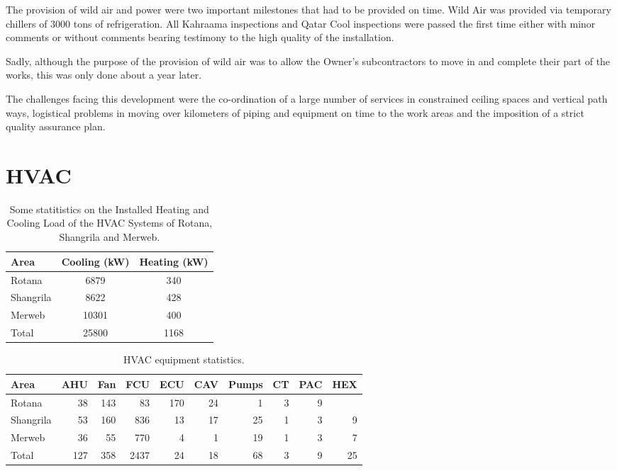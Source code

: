 \documentclass[oneside, justified, 11pt, a4paper]{tufte-book}
\begin{document}
The provision of wild air and power were two important milestones that had to be provided on time. Wild Air was provided via temporary chillers of 3000 tons of refrigeration. All Kahraama inspections and Qatar Cool inspections were passed the first time either with minor comments or without comments bearing testimony to the
high quality of the installation.


Sadly, although the purpose of the provision of wild air was to allow the Owner's subcontractors to move in and complete their part of the works, this was only done about a year later.



The challenges facing this development were the co-ordination of a large number of services in constrained ceiling spaces and vertical path ways, logistical problems in moving over kilometers of piping and equipment on time to the work areas and the imposition of a strict quality assurance plan.   


\section{HVAC}

\begin{table}[htbp]
\begin{tabular}{lcc}
\toprule
Area      & Cooling (kW) & Heating (kW)\\
\midrule
Rotana    & 6879   &340\\
Shangrila & 8622   &428\\
Merweb    & 10301  &400\\
\midrule
Total     & 25800  &1168\\
\bottomrule
\end{tabular}
\caption{Some statitistics on the Installed Heating and Cooling Load of the HVAC Systems of Rotana, Shangrila and Merweb.}
\end{table}
 
\begin{table}[htbp]
\vspace*{20pt}
\begin{tabular}{lrrrrrrrrr}
\toprule
Area     &AHU &Fan &FCU & ECU &CAV & Pumps & CT &PAC &HEX\\ 
\midrule
Rotana 	&38	&143	 &83  &170  &24	&1	&3	&9\\
Shangrila 	&53	&160	 &836  &13	&17	&25	&1	&3	&9\\
Merweb 	     &36	&55	 &770  &4 	&1	&19	&1	&3	&7\\
\midrule
Total 	    &127	&358	 &2437 &24	&18	&68	&3	&9	&25\\
\bottomrule
\end{tabular}
\caption{HVAC equipment statistics.}
\end{table}
\end{document}
